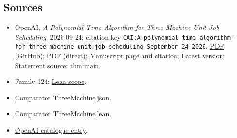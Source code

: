 \documentclass[11pt]{article}
\begin{document}
\subsection{Sources}
\begin{itemize}
\item OpenAI, \emph{A Polynomial-Time Algorithm for Three-Machine Unit-Job Scheduling}, 2026-09-24; citation key \texttt{OAI:A-polynomial-time-algorithm-for-three-machine-unit-job-scheduling-September-24-2026}. \href{https://github.com/openai/math/blob/adc7f1241b42e322a6451854ab7e4b4c146bf78a/preprints/A-polynomial-time-algorithm-for-three-machine-unit-job-scheduling-September-24-2026/paper.pdf}{PDF (GitHub)}; \href{https://github.com/openai/math/raw/adc7f1241b42e322a6451854ab7e4b4c146bf78a/preprints/A-polynomial-time-algorithm-for-three-machine-unit-job-scheduling-September-24-2026/paper.pdf}{PDF (direct)}; \href{https://github.com/openai/math/blob/adc7f1241b42e322a6451854ab7e4b4c146bf78a/preprints/A-polynomial-time-algorithm-for-three-machine-unit-job-scheduling-September-24-2026/README.md}{Manuscript page and citation}; \href{https://github.com/openai/math/blob/main/preprints/A-polynomial-time-algorithm-for-three-machine-unit-job-scheduling-September-24-2026/paper.pdf}{Latest version}; Statement source: \href{https://github.com/openai/math/blob/adc7f1241b42e322a6451854ab7e4b4c146bf78a/preprints/A-polynomial-time-algorithm-for-three-machine-unit-job-scheduling-September-24-2026/build/paper.tex\#L120}{thm:main}.
\item Family 124: \href{https://github.com/openai/math/blob/adc7f1241b42e322a6451854ab7e4b4c146bf78a/lean/docs/124.md}{Lean scope}.
\item \href{https://github.com/openai/math/blob/adc7f1241b42e322a6451854ab7e4b4c146bf78a/lean/ComparatorChallenges/ThreeMachine.json}{Comparator ThreeMachine.json}.
\item \href{https://github.com/openai/math/blob/adc7f1241b42e322a6451854ab7e4b4c146bf78a/lean/ComparatorChallenges/ThreeMachine.lean}{Comparator ThreeMachine.lean}.
\item \href{https://github.com/openai/math/blob/adc7f1241b42e322a6451854ab7e4b4c146bf78a/CONTENTS.md}{OpenAI catalogue entry}.
\end{itemize}
\end{document}
